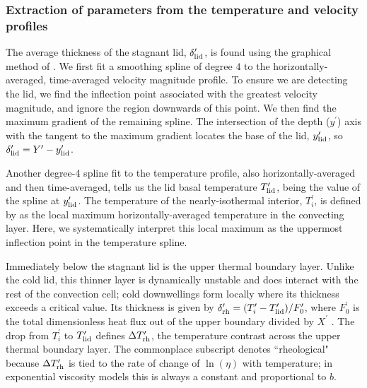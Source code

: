 \documentclass[trackchanges]{aastex63}
\begin{document}
\subsubsection{Extraction of parameters from the temperature and velocity profiles}  \label{sec:T_retrieval}



The average thickness of the stagnant lid, $\delta_{\rm lid}^\prime$, is found using the graphical method of \citet{solomatov_scaling_2000}. We first fit a smoothing spline of degree $4$ to the horizontally-averaged, time-averaged velocity magnitude profile. To ensure we are detecting the lid, we find the inflection point associated with the greatest velocity magnitude, and ignore the region downwards of this point. We then find the maximum gradient of the remaining spline. The intersection of the depth ($y^\prime$) axis with the tangent to the maximum gradient locates the base of the lid, $y^\prime_{\rm lid}$, so $\delta_{\rm lid}^\prime = Y^\prime - y^\prime_{\rm lid}$. 

Another degree-4 spline fit to the temperature profile, also horizontally-averaged and then time-averaged, tells us the lid basal temperature $T_{\rm lid}^\prime$, being the value of the spline at $y^\prime_{\rm lid}$. The temperature of the nearly-isothermal interior, $T_i^\prime$, is defined by \citet{solomatov_scaling_2000} as the local maximum horizontally-averaged temperature in the convecting layer. Here, we systematically interpret this local maximum as the uppermost inflection point in the temperature spline. 

Immediately below the stagnant lid is the upper thermal boundary layer. Unlike the cold lid, this thinner layer is dynamically unstable and does interact with the rest of the convection cell; cold downwellings form locally where its thickness exceeds a critical value. %
Its thickness is given by $\delta_{\rm rh}^\prime = (T_i^\prime - T_{\rm lid}^\prime)/F_0^\prime$, where $F_0^\prime$ is the total dimensionless heat flux out of the upper boundary divided by $X^\prime$ \citep{thiriet_scaling_2019}. The drop from $T_i^\prime$ to $T_{\rm lid}^\prime$ defines $\Delta T_{\rm rh}^\prime$, the temperature contrast across the upper thermal boundary layer. The commonplace subscript denotes ``rheological" because $\Delta T_{\rm rh}^\prime$ is tied to the rate of change of $\ln(\eta)$ with temperature; in exponential viscosity models this is always a constant and proportional to $b$.
\end{document}

